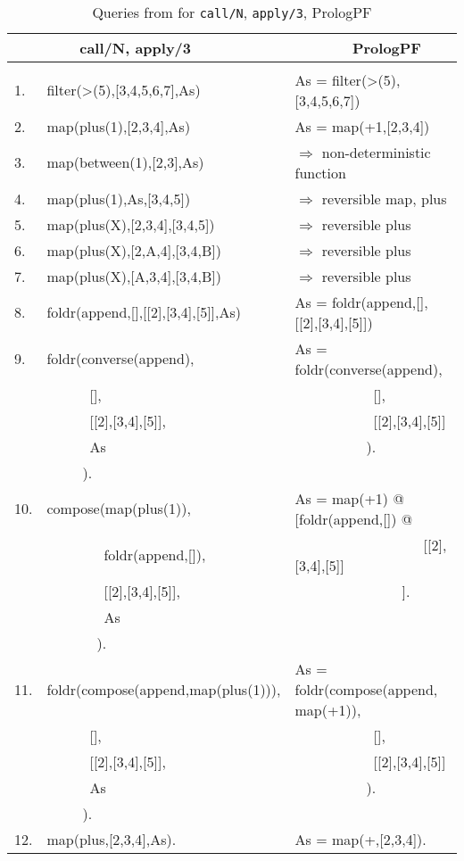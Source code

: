 \begin{table}[htb]
{\footnotesize
\tt
\begin{tabular}{| l | l | l |}
\hline
   &~~~~call/N, apply/3          &~~~~~~~PrologPF \\
\hline
& & \\
1. &filter(>(5),[3,4,5,6,7],As)  &As = filter(>(5),[3,4,5,6,7])\\
2. &map(plus(1),[2,3,4],As)      &As = map(+1,[2,3,4])\\
3. &map(between(1),[2,3],As)     &$\Rightarrow$ non-deterministic function\\
4. &map(plus(1),As,[3,4,5])      &$\Rightarrow$ reversible map, plus\\
5. &map(plus(X),[2,3,4],[3,4,5]) &$\Rightarrow$ reversible plus\\
6. &map(plus(X),[2,A,4],[3,4,B]) &$\Rightarrow$ reversible plus\\
7. &map(plus(X),[A,3,4],[3,4,B]) &$\Rightarrow$ reversible plus\\
8. &foldr(append,[],[[2],[3,4],[5]],As) &As = foldr(append,[],[[2],[3,4],[5]]) \\
9. &foldr(converse(append),      &As = foldr(converse(append),\\
   &~~~~~~[],                    &~~~~~~~~~~~[],\\
   &~~~~~~[[2],[3,4],[5]],       &~~~~~~~~~~~[[2],[3,4],[5]]\\
   &~~~~~~As                     &~~~~~~~~~~).\\
   &~~~~~).                      & \\
10. &compose(map(plus(1)),       &As = map(+1) @ [foldr(append,[]) @\\
    &~~~~~~~~foldr(append,[]),   &~~~~~~~~~~~~~~~~~~[[2],[3,4],[5]]\\
    &~~~~~~~~[[2],[3,4],[5]],    &~~~~~~~~~~~~~~~].\\
    &~~~~~~~~As                  & \\
    &~~~~~~~).                   & \\
11. &foldr(compose(append,map(plus(1))), &As = foldr(compose(append, map(+1)),\\
    &~~~~~~[],                           &~~~~~~~~~~~[],\\
    &~~~~~~[[2],[3,4],[5]],              &~~~~~~~~~~~[[2],[3,4],[5]]\\
    &~~~~~~As                            &~~~~~~~~~~). \\
    &~~~~~).                             & \\
12. &map(plus,[2,3,4],As).       & As = map(+,[2,3,4]).\\
\hline
\end{tabular}
}
\label{call_apply_queries}
\caption{Queries from \cite{Nai96} for \texttt{call/N}, \texttt{apply/3}, PrologPF}
\end{table}

